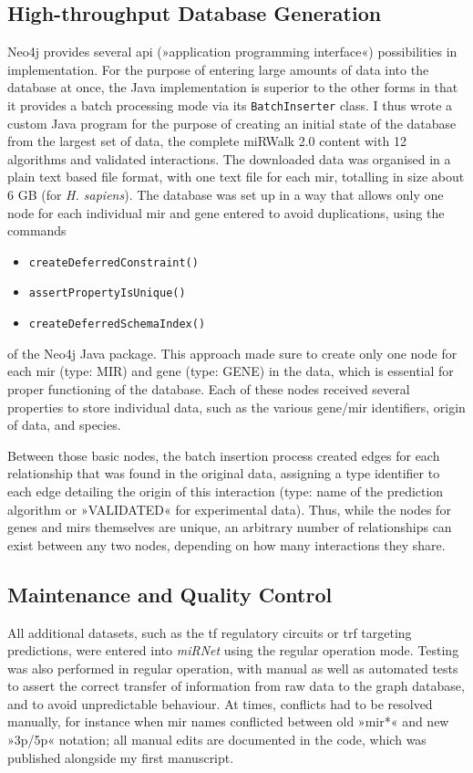 \subsection{High-throughput Database Generation}
Neo4j provides several \acs{api} (»application programming interface«) possibilities in implementation. For the purpose of entering large amounts of data into the database at once, the Java implementation is superior to the other forms in that it provides a batch processing mode via its \texttt{BatchInserter} class. I thus wrote a custom Java program for the purpose of creating an initial state of the database from the largest set of data, the complete miRWalk 2.0 content with 12 algorithms and validated interactions. The downloaded data was organised in a plain text based file format, with one text file for each \ac{mir}, totalling in size about 6 GB (for \textit{H. sapiens}). The database was set up in a way that allows only one node for each individual \ac{mir} and gene entered to avoid duplications, using the commands 
\begin{itemize}
\item \texttt{createDeferredConstraint()}
\item \texttt{assertPropertyIsUnique()}
\item \texttt{createDeferredSchemaIndex()} 
\end{itemize}
of the Neo4j Java package. This approach made sure to create only one node for each \ac{mir} (type: MIR) and gene (type: GENE) in the data, which is essential for proper functioning of the database. Each of these nodes received several properties to store individual data, such as the various gene/\ac{mir} identifiers, origin of data, and species. 

Between those basic nodes, the batch insertion process created edges for each relationship that was found in the original data, assigning a type identifier to each edge detailing the origin of this interaction (type: name of the prediction algorithm or »VALIDATED« for experimental data). Thus, while the nodes for genes and \acp{mir} themselves are unique, an arbitrary number of relationships can exist between any two nodes, depending on how many interactions they share.

\subsection{Maintenance and Quality Control}
All additional datasets, such as the \ac{tf} regulatory circuits or \ac{trf} targeting predictions, were entered into \textit{miRNet} using the regular operation mode. Testing was also performed in regular operation, with manual as well as automated tests to assert the correct transfer of information from raw data to the graph database, and to avoid unpredictable behaviour. At times, conflicts had to be resolved manually, for instance when \ac{mir} names conflicted between old »\ac{mir}*« and new »3p/5p« notation; all manual edits are documented in the code, which was published alongside my first manuscript\cite{Lobentanzer2019a}.

